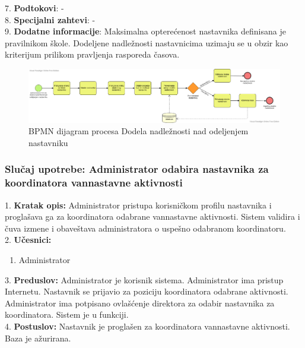 \documentclass{article}
\begin{document}
7. \textbf{Podtokovi}: - \\

8. \textbf{Specijalni zahtevi}: - \\

9. \textbf{Dodatne informacije}: Maksimalna opterećenost nastavnika definisana je pravilnikom škole. Dodeljene nadležnosti nastavnicima uzimaju se u obzir kao kriterijum prilikom pravljenja rasporeda časova. \\

\begin{landscape}
\begin{figure} [!ht]
    \begin{center}
        \includegraphics[scale=0.4]{imgs/BPMN_dodela_nadleznosti.png}
    \end{center}
\caption{BPMN dijagram procesa Dodela nadležnosti nad odeljenjem nastavniku}
\end{figure}
\end{landscape}

\subsubsection{Slučaj upotrebe: Administrator odabira nastavnika za koordinatora vannastavne aktivnosti}
1. \textbf{Kratak opis:} Administrator pristupa korisničkom profilu nastavnika i proglašava ga za koordinatora odabrane vannastavne aktivnosti. Sistem validira i čuva izmene i obaveštava administratora o uspešno odabranom koordinatoru. \\

2. \textbf{Učesnici:}
\begin{enumerate} [label=(\alph*)]
\item Administrator
\end{enumerate} 

3. \textbf{Preduslov:} Administrator je korisnik sistema. Administrator ima pristup Internetu. Nastavnik se prijavio za poziciju koordinatora odabrane aktivnosti. Administrator ima potpisano ovlašćenje direktora za odabir nastavnika za koordinatora. Sistem je u funkciji. \\

4. \textbf{Postuslov:} Nastavnik je proglašen za koordinatora vannastavne aktivnosti. Baza je ažurirana. \\
\end{document}
